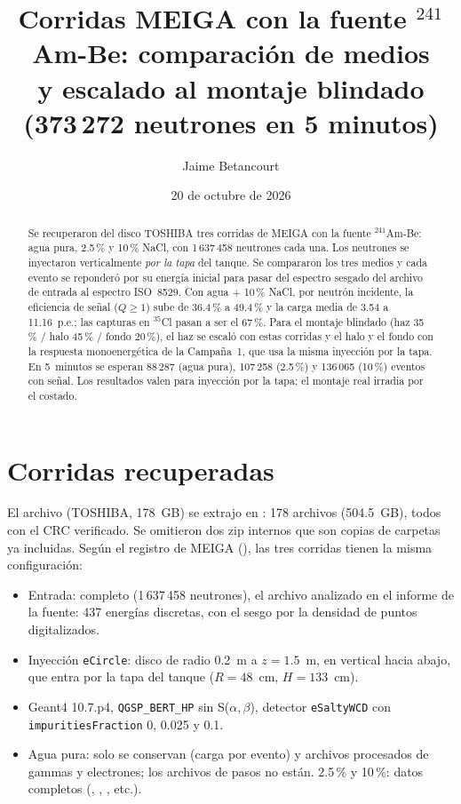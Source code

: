 \documentclass[11pt,a4paper]{article}
\title{Corridas MEIGA con la fuente $^{241}$Am-Be: comparación de medios\\
\large y escalado al montaje blindado (373\,272 neutrones en 5 minutos)}
\author{Jaime Betancourt}
\date{20 de octubre de 2026}
\begin{document}
\maketitle

\begin{abstract}
Se recuperaron del disco TOSHIBA tres corridas de MEIGA con la fuente $^{241}$Am-Be: agua pura, 2.5\,\%
y 10\,\% NaCl, con 1\,637\,458 neutrones cada una. Los neutrones se inyectaron verticalmente \emph{por la
tapa} del tanque. Se compararon los tres medios y cada evento se reponderó por su energía inicial para
pasar del espectro sesgado del archivo de entrada al espectro ISO~8529. Con agua + 10\,\% NaCl, por
neutrón incidente, la eficiencia de señal ($Q\geq1$) sube de 36.4\,\% a 49.4\,\% y la carga media de
3.54 a 11.16~p.e.; las capturas en $^{35}$Cl pasan a ser el 67\,\%. Para el montaje
blindado (haz 35\,\% / halo 45\,\% / fondo 20\,\%), el haz se escaló con estas corridas y el halo y el fondo
con la respuesta monoenergética de la Campaña~1, que usa la misma inyección por la tapa. En 5~minutos se
esperan 88\,287 (agua pura), 107\,258 (2.5\,\%) y 136\,065 (10\,\%) eventos con señal.
Los resultados valen para inyección por la tapa; el montaje real irradia por el costado.
\end{abstract}
\tableofcontents

\section{Corridas recuperadas}
El archivo  (TOSHIBA, 178~GB) se extrajo en
: 178 archivos (504.5~GB), todos con el
CRC verificado. Se omitieron dos zip internos que son copias de carpetas ya incluidas. Según el registro de MEIGA
(), las tres corridas tienen la misma configuración:
\begin{itemize}
\item Entrada:  completo (1\,637\,458 neutrones), el archivo analizado en el informe de la fuente: 437 energías discretas, con el sesgo por la densidad de puntos digitalizados.
\item Inyección \texttt{eCircle}: disco de radio 0.2~m a $z=1.5$~m, en vertical hacia abajo, que entra por la tapa del tanque ($R=48$~cm, $H=133$~cm).
\item Geant4 10.7.p4, \texttt{QGSP\_BERT\_HP} sin S($\alpha,\beta$), detector \texttt{eSaltyWCD} con \texttt{impuritiesFraction} 0, 0.025 y 0.1.
\item Agua pura: solo se conservan  (carga por evento) y archivos procesados de gammas y electrones; los archivos de pasos no están. 2.5\,\% y 10\,\%: datos completos (, , , etc.).
\end{itemize}
\end{document}
